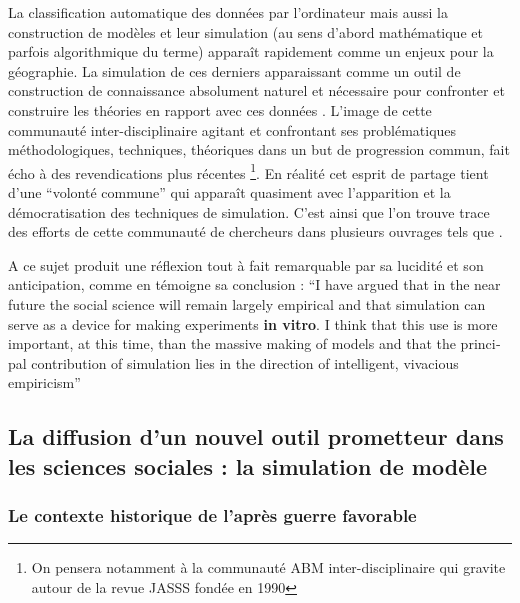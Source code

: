 La classification automatique des données par l'ordinateur mais aussi la construction de modèles et leur simulation (au sens d'abord mathématique et parfois algorithmique du terme) apparaît rapidement comme un enjeux pour la géographie. La simulation de ces derniers apparaissant comme un outil de construction de connaissance absolument naturel et nécessaire pour confronter et construire les théories en rapport avec ces données \autocite{Kao1963, Hagerstrand1967b}. L'image de cette communauté inter-disciplinaire agitant et confrontant ses problématiques méthodologiques, techniques, théoriques dans un but de progression commun, fait écho à des revendications plus récentes \footnote{On pensera notamment à la communauté ABM inter-disciplinaire qui gravite autour de la revue JASSS fondée en  1990}. En réalité cet esprit de partage tient d'une \enquote{volonté commune} qui apparaît quasiment avec l'apparition et la démocratisation des techniques de simulation. C'est ainsi que l'on trouve trace des efforts de cette communauté de chercheurs dans plusieurs ouvrages tels que \autocite{Beshers1965,Naylor1966,Dutton1971,Guetzkow1962,Guetzkow1972}.

A ce sujet \textcite{Fleisher1965} produit une réflexion tout à fait remarquable par sa lucidité et son anticipation, comme en témoigne sa conclusion : \foreignquote{english}{I have argued that in the near future the social science will remain largely empirical and that simulation can serve as a device for making experiments \textbf{in vitro}. I think that this use is more important, at this time, than the massive making of models and that the principal contribution of simulation lies in the direction of intelligent, vivacious empiricism} \autocite{Fleisher1965}


\subsection{La diffusion d'un nouvel outil prometteur dans les sciences sociales : la simulation de modèle}

\subsubsection{Le contexte historique de l'après guerre favorable}

